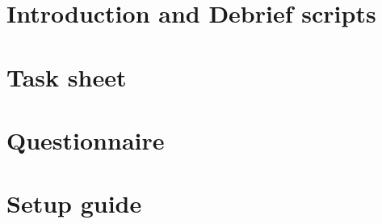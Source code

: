 \documentclass{l4proj}
\begin{document}
\begin{appendices}
\begin{minipage}{\textwidth}
		\section{Introduction and Debrief scripts}
		
	\end{minipage}
	\clearpage
	\begin{minipage}{\textwidth}
		\section{Task sheet}
		
	\end{minipage}
	\clearpage
	\begin{minipage}{\textwidth}
		\section{Questionnaire}
		
	\end{minipage}
	\clearpage
	\begin{minipage}{\textwidth}
		\section{Setup guide}
		
	\end{minipage}
	
\end{appendices}




\end{document}
